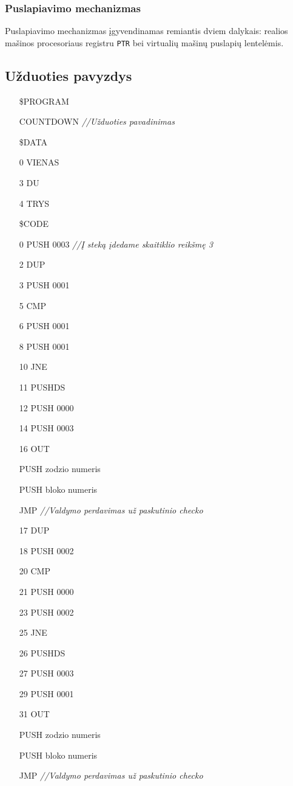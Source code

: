 \documentclass{scrartcl}
\begin{document}
            \subsubsection{Puslapiavimo mechanizmas}
                Puslapiavimo mechanizmas įgyvendinamas remiantis dviem dalykais: realios mašinos procesoriaus registru \texttt{PTR} bei virtualių mašinų puslapių lentelėmis.
		\subsection{Užduoties pavyzdys}
			\begin{itemize}
				\item[] \$PROGRAM	
				\item[] COUNTDOWN	\emph{//Užduoties pavadinimas}
				\item[] \$DATA
				\item[0] VIENAS
				\item[3] DU
				\item[4] TRYS
				\item[] \$CODE
				
				\item [0] PUSH 0003	\emph{//Į steką įdedame skaitiklio reikšmę 3}
				\item [2] DUP
				\item [3] PUSH 0001
				\item [5] CMP
				\item [6] PUSH 0001
				\item [8] PUSH 0001
				\item [10] JNE
				\item [11] PUSHDS
				\item [12] PUSH 0000
				\item [14] PUSH 0003
				\item [16] OUT
				\item [] PUSH zodzio numeris
				\item [] PUSH bloko numeris
				\item [] JMP	\emph{//Valdymo perdavimas už paskutinio checko}
				
				\item [17] DUP
				\item [18] PUSH 0002
				\item [20] CMP		
				\item [21] PUSH 0000
				\item [23] PUSH 0002
				\item [25] JNE 		
				\item [26] PUSHDS
				\item [27] PUSH 0003
				\item [29] PUSH 0001
				\item [31] OUT
				\item [] PUSH zodzio numeris
				\item [] PUSH bloko numeris
				\item [] JMP	\emph{//Valdymo perdavimas už paskutinio checko}
				

\end{itemize}
\end{document}
